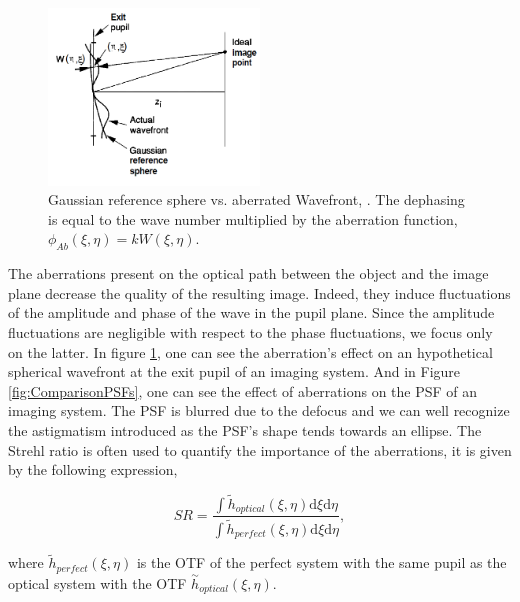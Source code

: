 \begin{minipage}{\linewidth}
\begin{figure}
\centering
\includegraphics[width=0.5\textwidth]{Figures/AbWFvsGausSphWF}
\decoRulewrapFig
\caption[Gaussian reference sphere vs. aberrated Wavefront]{Gaussian reference sphere vs. aberrated Wavefront, \citep[Chapter 6.4]{goodman_1968}. The dephasing is equal to the wave number multiplied by the aberration function, $\phi_{Ab}(\xi,\eta) = k W(\xi,\eta)$.}
\label{fig:AbWFvsGausSphWF}
\end{figure}

The aberrations present on the optical path between the object and the image plane decrease the quality of the resulting image. Indeed, they induce fluctuations of the amplitude and phase of the wave in the pupil plane. Since the amplitude fluctuations are negligible with respect to the phase fluctuations, we focus only on the latter. In figure \ref{fig:AbWFvsGausSphWF}, one can see the aberration's effect on an hypothetical spherical wavefront at the exit pupil of an imaging system. And in Figure \ref{fig:ComparisonPSFs}, one can see the effect of aberrations on the PSF of an imaging system. The PSF is blurred due to the defocus and we can well recognize the astigmatism introduced as the PSF's shape tends towards an ellipse. The Strehl ratio is often used to quantify the importance of the aberrations, it is given by the following expression,

\begin{equation}
SR = \frac{\int \widetilde{h}_{optical}(\xi,\eta)\mathrm{d}\xi \mathrm{d}\eta}{\int \widetilde{h}_{perfect}(\xi,\eta) \mathrm{d}\xi \mathrm{d}\eta},
\label{eqt:StrehlRatio}
\end{equation}

where $\widetilde{h}_{perfect}(\xi,\eta)$ is the OTF of the perfect system with the same pupil as the optical system with the OTF $\overset{\sim}{h}_{optical}(\xi,\eta)$.
\end{minipage}

